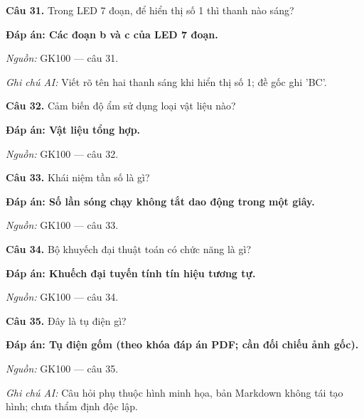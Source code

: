 \documentclass[11pt,a4paper]{article}
\begin{document}
\textbf{Câu 31.} Trong LED 7 đoạn, để hiển thị số 1 thì thanh nào sáng?\par
{\color{answer}\textbf{Đáp án: Các đoạn b và c của LED 7 đoạn.}}\par
{\footnotesize\color{sourcegray}\textit{Nguồn:} GK100 — câu 31.\par}
{\footnotesize\color{sourcegray}\textit{Ghi chú AI:} Viết rõ tên hai thanh sáng khi hiển thị số 1; đề gốc ghi 'BC'.\par}
\vspace{3pt}\par\noindent{\color{black!18}\rule{\linewidth}{0.3pt}}\par\medskip

\textbf{Câu 32.} Cảm biến độ ẩm sử dụng loại vật liệu nào?\par
{\color{answer}\textbf{Đáp án: Vật liệu tổng hợp.}}\par
{\footnotesize\color{sourcegray}\textit{Nguồn:} GK100 — câu 32.\par}
\vspace{3pt}\par\noindent{\color{black!18}\rule{\linewidth}{0.3pt}}\par\medskip

\textbf{Câu 33.} Khái niệm tần số là gì?\par
{\color{answer}\textbf{Đáp án: Số lần sóng chạy không tắt dao động trong một giây.}}\par
{\footnotesize\color{sourcegray}\textit{Nguồn:} GK100 — câu 33.\par}
\vspace{3pt}\par\noindent{\color{black!18}\rule{\linewidth}{0.3pt}}\par\medskip

\textbf{Câu 34.} Bộ khuyếch đại thuật toán có chức năng là gì?\par
{\color{answer}\textbf{Đáp án: Khuếch đại tuyến tính tín hiệu tương tự.}}\par
{\footnotesize\color{sourcegray}\textit{Nguồn:} GK100 — câu 34.\par}
\vspace{3pt}\par\noindent{\color{black!18}\rule{\linewidth}{0.3pt}}\par\medskip

\textbf{Câu 35.} Đây là tụ điện gì?\par
{\color{answer}\textbf{Đáp án: Tụ điện gốm (theo khóa đáp án PDF; cần đối chiếu ảnh gốc).}}\par
{\footnotesize\color{sourcegray}\textit{Nguồn:} GK100 — câu 35.\par}
{\footnotesize\color{sourcegray}\textit{Ghi chú AI:} Câu hỏi phụ thuộc hình minh họa, bản Markdown không tái tạo hình; chưa thẩm định độc lập.\par}
\vspace{3pt}\par\noindent{\color{black!18}\rule{\linewidth}{0.3pt}}\par\medskip
\end{document}
